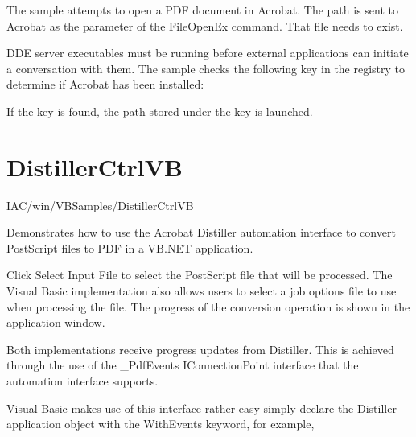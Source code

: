 \documentclass[letterpaper,12pt,english,openany,oneside]{sphinxmanual}
\begin{document}
\label{\detokenize{Samples_WindowsIAC:usage-6}}

The sample attempts to open a PDF document in Acrobat. The path  is sent to Acrobat as the parameter of the FileOpenEx command. That file needs to exist.


DDE server executables must be running before external applications can initiate a conversation with them. The sample checks the following key in the registry to determine if Acrobat has been installed:


If the key is found, the path stored under the key is launched.


\section{DistillerCtrlVB}
\label{\detokenize{Samples_WindowsIAC:distillerctrlvb}}\label{\detokenize{Samples_WindowsIAC:location-11}}

IAC/win/VBSamples/DistillerCtrlVB

\label{\detokenize{Samples_WindowsIAC:description-11}}

Demonstrates how to use the Acrobat Distiller automation interface to convert PostScript files to PDF in a VB.NET application.

\label{\detokenize{Samples_WindowsIAC:usage-7}}

Click Select Input File to select the PostScript file that will be processed. The Visual Basic implementation also allows users to select a job options file to use when processing the file. The progress of the conversion operation is shown in the application window.

\label{\detokenize{Samples_WindowsIAC:implementation-details-1}}

Both implementations receive progress updates from Distiller. This is achieved through the use of the \_PdfEvents IConnectionPoint interface that the automation interface supports.

Visual Basic makes use of this interface rather easy \sphinxhyphen{} simply declare the Distiller application object with the WithEvents keyword, for example, 
\end{document}
